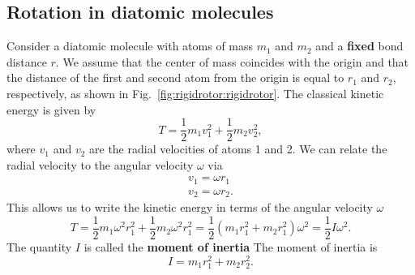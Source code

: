 \documentclass[../Main/chem331-notes.tex]{subfiles}
\begin{document}
\subsection{Rotation in diatomic molecules}
Consider a diatomic molecule with atoms of mass $m_1$ and $m_2$ and a \textbf{fixed} bond distance $r$.
We assume that the center of mass coincides with the origin and that the distance of the first and second atom from the origin is equal to $r_1$ and $r_2$, respectively, as shown in Fig.~\ref{fig:rigidrotor:rigidrotor}.
The classical kinetic energy is given by
\begin{equation}
T = \frac{1}{2} m_1 v_1^2 + \frac{1}{2} m_2 v_2^2,
\end{equation}
where $v_1$ and $v_2$ are the radial velocities of atoms 1 and 2.
We can relate the radial velocity to the angular velocity $\omega$ via
\begin{align}
v_1 = \omega r_1 \\
v_2 = \omega r_2.
\end{align}
This allows us to write the kinetic energy in terms of the angular velocity $\omega$
\begin{equation}
T = \frac{1}{2} m_1 \omega^2 r_1^2 + \frac{1}{2} m_2 \omega^2 r_1^2
 = \frac{1}{2} (m_1 r_1^2 + m_2 r_1^2)  \omega^2 
 = \frac{1}{2} I \omega^2.
\end{equation}
The quantity $I$ is called the \textbf{moment of inertia} 
The moment of inertia is
\begin{equation}
I = m_1 r_1^2 + m_2 r_2^2. %
\end{equation}
\end{document}
